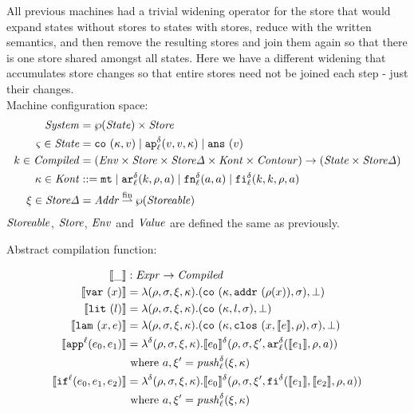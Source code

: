 \documentclass{llncs}
\newcommand{\finto}{\mathbin{\overset{\text{fin}}{\rightharpoonup}}}
\newcommand{\alt}{\mid}
\begin{document}
All previous machines had a trivial widening operator for the store
that would expand states without stores to states with stores, reduce
with the written semantics, and then remove the resulting stores and
join them again so that there is one store shared amongst all
states. Here we have a different widening that accumulates store
changes so that entire stores need not be joined each step - just
their changes.
\\
Machine configuration space:
\begin{align*}
\System &= \wp(\State) \times \Store \\
\mstate \in \State &= \co{\mkont, \mval} \alt
                     \ap[_\mlab^\mcntr]{\mval,\mval,\mkont} \alt
                     \ans{\mval} \\
\mcomp \in \Compiled &=
  (\Env \times \Store \times \StoreDelta \times \Kont \times \Counter) \to
   (\State \times \StoreDelta) \\
\mkont \in \Kont &::= \kmt \alt
                      \kar[_\mlab^\mcntr]{\mcomp, \menv, \maddr} \alt
                      \kfn[_\mlab^\mcntr]{\maddr, \maddr} \alt
                      \kif[_\mlab^\mcntr]{\mcomp, \mcomp, \menv, \maddr} \\
\msdiff \in \StoreDelta &= \Addr \finto \wp(\Storeable) \\
\end{align*}
$\Storeable$, $\Store$, $\Env$ and $\Value$ are defined the same as previously.

Abstract compilation function:

\begin{align*}
\compile{\_} &: \Expr \to \Compiled \\
\compile{\svar\mvar} &= \lambda(\menv,\msto,\msdiff, \mkont) .\ttuple{\co{\mkont,\saddr{\menv(\mvar)},\msto}}{\bot}
\\
\compile{\slit\mlit} &= \lambda(\menv,\msto,\msdiff,\mkont) .
\ttuple{\co{\mkont,\mlit,\msto}}{\bot}
\\
\compile{\slam\mvar\mexp} &= \lambda(\menv,\msto,\msdiff,\mkont) .
\ttuple{\co{\mkont,\clos{\mvar,\compile\mexp,\menv},\msto}}{\bot}
\\
\compile{\sapp[^\mlab]{\mexpi0}{\mexpi1}} &= \lambda^\mcntr (\menv,\msto,\msdiff,\mkont) .
\compile{\mexpi0}^\mcntr(\menv,\msto,\msdiff',\kar[_\mlab^\mcntr]{\compile{\mexpi1},\menv,\maddr})
\\
&
\text{ where }\maddr,\msdiff' = \push^\mcntr_\mlab(\msdiff,\mkont)
\\
\compile{\sif[^\mlab]{\mexpi0}{\mexpi1}{\mexpi2}} &= \lambda^\mcntr(\menv,\msto,\msdiff,\mkont) .
\compile{\mexpi0}^\delta(\menv,\msto,\msdiff',\kif[^\mcntr]{\compile{\mexpi1},\compile{\mexpi2},\menv,\maddr})
\\
&\text{ where }\maddr,\msdiff' = \push_\mlab^\mcntr(\msdiff,\mkont)
\end{align*}
\end{document}
